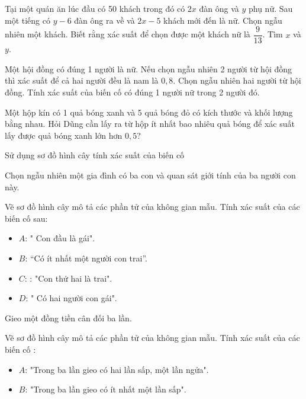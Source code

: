 \begin{vd}
	Tại một quán ăn lúc đầu có 50 khách trong đó có $2x$ đàn ông và $y$ phụ nữ. Sau một tiếng có $y-6$ đàn ông ra về và $2x-5$ khách mới đến là nữ. Chọn ngẫu nhiên một khách. Biết rằng xác suất để chọn được một khách nữ là $\dfrac{9}{13}$. Tìm $x$ và $y$.
\end{vd} 
\begin{vd}
	Một hội đồng có đúng 1 người là nữ. Nếu chọn ngẫu nhiên 2 người từ hội đồng thì xác suất để cả hai người đều là nam là $0,8$. Chọn ngẫu nhiên hai người từ hội đồng. Tính xác suất của biến cố có đúng 1 người nữ trong 2 người đó.
\end{vd} 
\begin{vd}
	Một hộp kín có 1 quả bóng xanh và 5 quả bóng đỏ có kích thước và khối lượng bằng nhau. Hỏi Dũng cần lấy ra từ hộp ít nhất bao nhiêu quả bóng để xác suất lấy được quả bóng xanh lớn hơn $0,5$?
\end{vd} 
\begin{dang}
	{Sử dụng sơ đồ hình cây tính xác suất của biến cố}
\end{dang}
\begin{vd}
	Chọn ngẫu nhiên một gia đình có ba con và quan sát giới tính của ba người con này.
	\begin{tasks}
		\task Vẽ sơ đồ hình cây mô tả các phần tử của không gian mẫu.
		\task 	Tính xác suất của các biến cố sau:
		\begin{itemize}
			\item $A$: " Con đầu là gái".
			\item $B$: “Có ít nhất một người con trai”.
			\item $C$: : "Con thứ hai là trai".
			\item $D$: " Có hai người con gái".
		\end{itemize}
	\end{tasks}
\end{vd} 
\begin{vd}
	Gieo một đồng tiền cân đối ba lần.
	\begin{tasks}
		\task Vẽ sơ đồ hình cây mô tả các phần tử của không gian mẫu.
		\task Tính xác suất của các biến cố :
		\begin{itemize}
			\item $A$: "Trong ba lần gieo có hai lần sấp, một lần ngửa".
			\item $B$: "Trong ba lần gieo có ít nhất một lần sấp".
		\end{itemize}
	\end{tasks}
\end{vd} 

